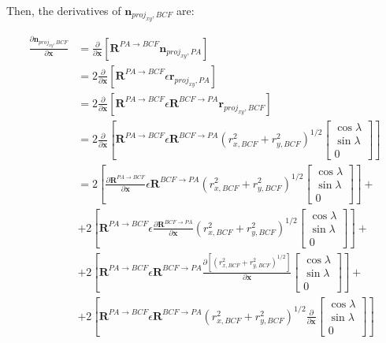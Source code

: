\documentclass[]{article}
\newcommand{\vb}[1]{\bm{#1}} %
\newcommand{\pd}[2]{\frac{\partial #1}{\partial #2}} %
\begin{document}
Then, the derivatives of $\vb{n}_{proj_{xy},BCF}$ are:

\begin{align}
	\pd{\vb{n}_{proj_{xy},BCF}}{\vb{x}} &= \pd{}{\vb{x}} \left[ \vb{R}^{PA \rightarrow BCF} \vb{n}_{proj_{xy}, PA} \right] \\
	&= 2 \pd{}{\vb{x}} \left[ \vb{R}^{PA \rightarrow BCF} \epsilon \vb{r}_{proj_{xy}, PA} \right] \\
	&= 2 \pd{}{\vb{x}} \left[ \vb{R}^{PA \rightarrow BCF} \epsilon \vb{R}^{BCF \rightarrow PA} \vb{r}_{proj_{xy}, BCF} \right] \\
	&= 2 \pd{}{\vb{x}} \left[ \vb{R}^{PA \rightarrow BCF} \epsilon \vb{R}^{BCF \rightarrow PA} \left( r_{x, BCF}^2 + r_{y, BCF}^2 \right)^{1/2} \left[ \begin{array}{c} \cos \lambda \\ \sin \lambda \\ 0 \end{array} \right] \right] \\
	&= 2 \left[ \pd{\vb{R}^{PA \rightarrow BCF}}{\vb{x}} \epsilon \vb{R}^{BCF \rightarrow PA} \left( r_{x, BCF}^2 + r_{y, BCF}^2 \right)^{1/2} \left[ \begin{array}{c} \cos \lambda \\ \sin \lambda \\ 0 \end{array} \right] \right] + \nonumber \\
	&+ 2 \left[ \vb{R}^{PA \rightarrow BCF} \epsilon \pd{\vb{R}^{BCF \rightarrow PA}}{\vb{x}} \left( r_{x, BCF}^2 + r_{y, BCF}^2 \right)^{1/2} \left[ \begin{array}{c} \cos \lambda \\ \sin \lambda \\ 0 \end{array} \right] \right] + \nonumber \\
	&+ 2 \left[ \vb{R}^{PA \rightarrow BCF} \epsilon \vb{R}^{BCF \rightarrow PA} \pd{\left[ \left( r_{x, BCF}^2 + r_{y, BCF}^2 \right)^{1/2} \right]}{\vb{x}} \left[ \begin{array}{c} \cos \lambda \\ \sin \lambda \\ 0 \end{array} \right] \right] + \nonumber \\
	&+ 2 \left[ \vb{R}^{PA \rightarrow BCF} \epsilon \vb{R}^{BCF \rightarrow PA} \left( r_{x, BCF}^2 + r_{y, BCF}^2 \right)^{1/2} \pd{}{\vb{x}} \left[ \begin{array}{c} \cos \lambda \\ \sin \lambda \\ 0 \end{array} \right] \right]  
\end{align}
\end{document}
